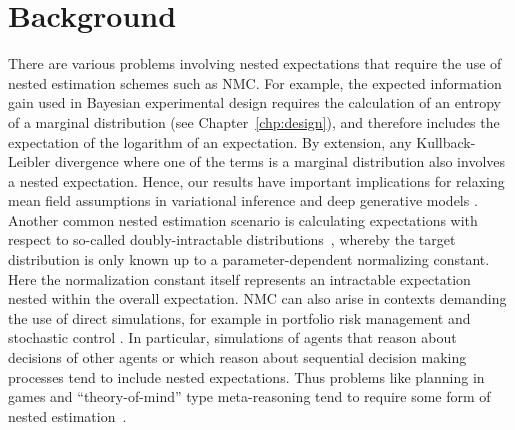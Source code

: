 
\section{Background}
\label{sec:intro}


There are various problems involving nested expectations that require the use of nested
estimation schemes such as NMC. For example, the expected information gain used in
Bayesian experimental design requires
the calculation of an entropy of a marginal distribution (see Chapter~\ref{chp:design}), and therefore includes the
expectation of the logarithm of an expectation.  By extension, any Kullback-Leibler
divergence where one of the terms is a marginal distribution also involves a nested expectation.  Hence, our results have important implications for relaxing mean field assumptions in variational
inference \citep{hoffman2015stochastic,naesseth2017variational,maddison2017filtering} and deep generative models
\citep{burda2015importance,maaloe2016auxiliary,le2017auto}.
Another common nested estimation scenario is calculating expectations with respect to so-called
doubly-intractable distributions~\citep{moller2006efficient,murray2006mcmc,liang2010double}, whereby
the target distribution is only known up to a parameter-dependent normalizing constant.  Here
the normalization constant itself represents an intractable expectation
nested within the overall expectation.
NMC can also arise in contexts demanding the use
of direct \mc simulations, for example in portfolio risk management
\citep{gordy2010nested} and stochastic control \citep{belomestny2010regression}. 
In particular, 
simulations of agents that reason about decisions of other agents or which
reason about sequential decision making processes tend to include nested expectations.
Thus problems like planning in games and ``theory-of-mind'' type meta-reasoning
tend to require some form of nested
 estimation~\citep{stuhlmuller2014reasoning,evans2017models}.

